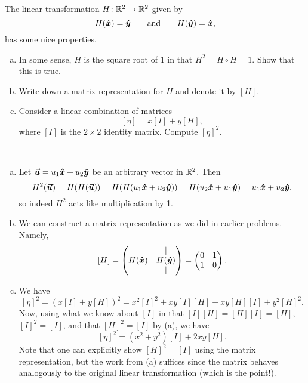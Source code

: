 \documentclass[12pt]{article} %
\begin{document}
\newpage
\begin{problem}
    The linear transformation $H\colon \mathbb{R}^2 \to \mathbb{R}^2$ given by
    \[
        H(\boldsymbol{\hat{x}}) = \boldsymbol{\hat{y}} \qquad \textrm{and} \qquad H(\boldsymbol{\hat{y}}) = \boldsymbol{\hat{x}},
    \]
    has some nice properties. 
    \begin{enumerate}[(a)]
        \item In some sense, $H$ is the square root of $1$ in that $H^2 = H \circ H = 1$. Show that this is true.
        \item Write down a matrix representation for $H$ and denote it by $[H]$.
        \item Consider a linear combination of matrices 
        \[
            [\eta] = x[I] + y[H],
        \]
        where $[I]$ is the $2\times 2$ identity matrix. Compute $[\eta]^2$.  
    \end{enumerate} 
\end{problem}
\begin{solution}~
    \begin{enumerate}[(a)]
        \item Let $\boldsymbol{\boldsymbol{\vec{u}}} = u_1 \boldsymbol{\hat{x}} + u_2 \boldsymbol{\hat{y}}$ be an arbitrary vector in $\mathbb{R}^2$.  Then
        \[
        H^2 (\boldsymbol{\boldsymbol{\vec{u}}}) = H(H(\boldsymbol{\boldsymbol{\vec{u}}})) = H(H(u_1\boldsymbol{\hat{x}} + u_2 \boldsymbol{\hat{y}})) = H(u_2\boldsymbol{\hat{x}} + u_1 \boldsymbol{\hat{y}}) = u_1 \boldsymbol{\hat{x}} + u_2\boldsymbol{\hat{y}},
        \]
        so indeed $H^2$ acts like multiplication by 1.
        \item We can construct a matrix representation as we did in earlier problems.  Namely,
        \[
        [H] = \begin{pmatrix} \vert & \vert \\ H(\boldsymbol{\hat{x}}) & H(\boldsymbol{\hat{y}}) \\ \vert & \vert \end{pmatrix} = \begin{pmatrix} 0 & 1 \\ 1 & 0 \end{pmatrix}.
        \]
        \item We have
        \[
        [\eta]^2 = (x[I]+y[H])^2 = x^2 [I]^2 + xy[I][H] + xy [H][I] + y^2 [H]^2.
        \]
        Now, using what we know about $[I]$ in that $[I][H]=[H][I]=[H]$, $[I]^2=[I]$, and that $[H]^2=[I]$ by (a), we have
        \[
        [\eta]^2 = (x^2+y^2) [I] + 2xy [H].
        \]
        Note that one can explicitly show $[H]^2=[I]$ using the matrix representation, but the work from (a) suffices since the matrix behaves analogously to the original linear transformation (which is the point!).
    \end{enumerate}
\end{solution}
\end{document}
